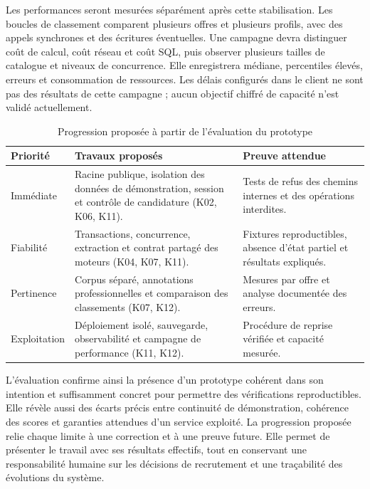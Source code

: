 Les performances seront mesurées séparément après cette stabilisation. Les boucles de classement comparent plusieurs offres et plusieurs profils, avec des appels synchrones et des écritures éventuelles. Une campagne devra distinguer coût de calcul, coût réseau et coût SQL, puis observer plusieurs tailles de catalogue et niveaux de concurrence. Elle enregistrera médiane, percentiles élevés, erreurs et consommation de ressources. Les délais configurés dans le client ne sont pas des résultats de cette campagne ; aucun objectif chiffré de capacité n'est validé actuellement.

\begin{table}[htbp]
\centering
\small
\caption{Progression proposée à partir de l'évaluation du prototype}
\label{tab:validation-roadmap}
\begin{tabularx}{\textwidth}{@{}P{0.16\textwidth}XX@{}}
\toprule
Priorité & Travaux proposés & Preuve attendue \\
\midrule
Immédiate & Racine publique, isolation des données de démonstration, session et contrôle de candidature (K02, K06, K11). & Tests de refus des chemins internes et des opérations interdites. \\
Fiabilité & Transactions, concurrence, extraction et contrat partagé des moteurs (K04, K07, K11). & Fixtures reproductibles, absence d'état partiel et résultats expliqués. \\
Pertinence & Corpus séparé, annotations professionnelles et comparaison des classements (K07, K12). & Mesures par offre et analyse documentée des erreurs. \\
Exploitation & Déploiement isolé, sauvegarde, observabilité et campagne de performance (K11, K12). & Procédure de reprise vérifiée et capacité mesurée. \\
\bottomrule
\end{tabularx}
\end{table}

L'évaluation confirme ainsi la présence d'un prototype cohérent dans son intention et suffisamment concret pour permettre des vérifications reproductibles. Elle révèle aussi des écarts précis entre continuité de démonstration, cohérence des scores et garanties attendues d'un service exploité. La progression proposée relie chaque limite à une correction et à une preuve future. Elle permet de présenter le travail avec ses résultats effectifs, tout en conservant une responsabilité humaine sur les décisions de recrutement et une traçabilité des évolutions du système.
